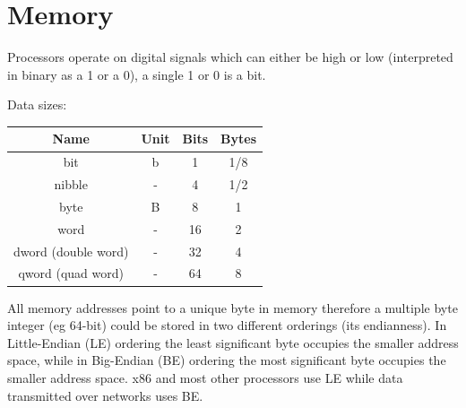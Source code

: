 \documentclass{article}
\newcommand{\layout}[1]{\parbox{\linewidth}{#1}}
\begin{document}
%
%
%



\layout{
  \section{Memory}

  Processors operate on digital signals which can either be high or low (interpreted in binary as a 1 or a 0), a single 1 or 0 is a bit.
} \bigskip

\layout{
  Data sizes:
  \begin{table}[H]
    \centering
    \begin{tabular}{|c|c|c|c|}
      \hline \textbf{Name} & \textbf{Unit} & \textbf{Bits} & \textbf{Bytes} \\ \hline
      bit & b & 1 & 1/8 \\
      nibble & - & 4 & 1/2 \\
      byte & B & 8 & 1 \\
      word & - & 16 & 2 \\
      dword (double word) & - & 32 & 4 \\
      qword (quad word) & - & 64 & 8 \\ \hline
    \end{tabular}
  \end{table}
}

\layout{
  All memory addresses point to a unique byte in memory therefore a multiple byte integer (eg 64-bit) could be stored in two different orderings (its endianness). In Little-Endian (LE) ordering the least significant byte occupies the smaller address space, while in Big-Endian (BE) ordering the most significant byte occupies the smaller address space. x86 and most other processors use LE while data transmitted over networks uses BE.

  \bigskip \cite[Chapter~1.3.1]{sdm1}
}
\end{document}
